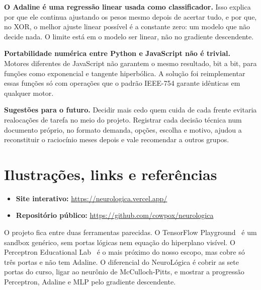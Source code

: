 \documentclass[11pt]{article}
\begin{document}
\smallskip
\textbf{O Adaline é uma regressão linear usada como classificador.} Isso explica por que ele
continua ajustando os pesos mesmo depois de acertar tudo, e por que, no XOR, o melhor ajuste
linear possível é a constante zero: um modelo que não decide nada. O limite está em o modelo
ser linear, não no gradiente descendente.

\smallskip
\textbf{Portabilidade numérica entre Python e JavaScript não é trivial.} Motores diferentes
de JavaScript não garantem o mesmo resultado, bit a bit, para funções como exponencial e
tangente hiperbólica. A solução foi reimplementar essas funções só com operações que o
padrão IEEE-754 garante idênticas em qualquer motor.

\smallskip
\textbf{Sugestões para o futuro.} Decidir mais cedo quem cuida de cada frente evitaria
realocações de tarefa no meio do projeto. Registrar cada decisão técnica num documento
próprio, no formato demanda, opções, escolha e motivo, ajudou a reconstituir o raciocínio
meses depois e vale recomendar a outros grupos.

\section{Ilustrações, links e referências}

\begin{itemize}
    \item \textbf{Site interativo:} \url{https://neurologica.vercel.app/}
    \item \textbf{Repositório público:} \url{https://github.com/cowpox/neurologica}
\end{itemize}

\smallskip

%

O projeto fica entre duas ferramentas parecidas. O TensorFlow
Playground~\cite{smilkov2017playground} é um sandbox genérico, sem portas lógicas nem
equação do hiperplano visível. O Perceptron Educational Lab~\cite{vlabs2016perceptron} é o
mais próximo do nosso escopo, mas cobre só três portas e não tem Adaline. O diferencial do
NeuroLógica é cobrir as sete portas do curso, ligar ao neurônio de McCulloch-Pitts, e mostrar
a progressão Perceptron, Adaline e MLP pelo gradiente descendente.
\end{document}

